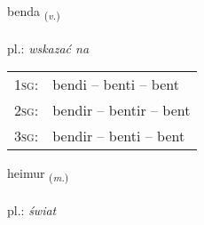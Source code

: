 \documentclass[frontgrid, backgrid]{flacards}\usepackage[]{graphicx}\usepackage[]{xcolor}
\begin{document}
{benda \small{\textsubscript{(\textit{v.})}} \\[1ex] %
\textphonetic{[pɛnta]} \\
pl.: \emph{wskazać na} \\  [2ex]
\renewcommand*{\arraystretch}{0.8}
\begin{tabular}{p{1cm}l}
\textsc{1sg}: & bendi -- benti -- bent \\ 
\textsc{2sg}: & bendir -- bentir -- bent \\ 
\textsc{3sg}: & bendir -- benti -- bent \\ 
\end{tabular}
}

\renewcommand{\flhead}{\vskip5pt \fboxsep=0pt {\small\bfseries\footnotesize Nafnorð | rzeczownik}}
\renewcommand{\fcfoot}{\vskip5pt \fboxsep=0pt \hspace{2pt}{\small\bfseries\footnotesize 1K}}

\renewcommand{\blhead}{\vskip5pt {\small\bfseries\footnotesize Nafnorð | rzeczownik }}
\renewcommand{\bcfoot}{\vskip5pt \hspace{2pt}{\small\bfseries\footnotesize 1K}}


{heimur \small{\textsubscript{(\textit{m.})}} \\[1ex] %
\textphonetic{[heiːmʏr]} \\
pl.: \emph{świat} \\  [2ex]
\renewcommand*{\arraystretch}{0.8}
}

\renewcommand{\flhead}{\vskip5pt \fboxsep=0pt {\small\bfseries\footnotesize Sagnorð | czasownik}}
\renewcommand{\fcfoot}{\vskip5pt \fboxsep=0pt \hspace{2pt}{\small\bfseries\footnotesize 1K}}
\end{document}

